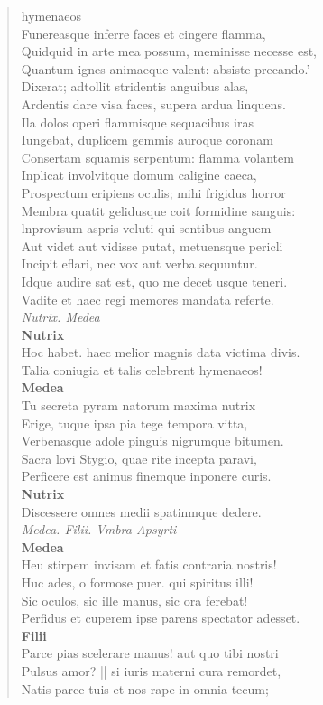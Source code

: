 \documentclass[11pt, a4paper]{report}
\begin{document}
\begin{verse}
{hymenaeos \\ Funereasque inferre faces et cingere flamma, \\ Quidquid in arte mea possum, meminisse necesse est, \\ Quantum ignes animaeque valent: absiste precando.’ \\ Dixerat; adtollit stridentis anguibus alas, \\ Ardentis dare visa faces, supera ardua linquens. \\ Ila dolos operi flammisque sequacibus iras \\ Iungebat, duplicem gemmis auroque coronam \\ Consertam squamis serpentum: flamma volantem \\ Inplicat involvitque domum caligine caeca, \\ Prospectum eripiens oculis; mihi frigidus horror \\ Membra quatit gelidusque coit formidine sanguis: \\ lnprovisum aspris veluti qui sentibus anguem \\ Aut videt aut vidisse putat, metuensque pericli \\ Incipit eflari, nec vox aut verba sequuntur. \\ Idque audire sat est, quo me decet usque teneri. \\ Vadite et haec regi memores mandata referte. \\ \textit{Nutrix. Medea} \\ \textbf{Nutrix} \\Hoc habet. haec melior magnis data victima divis. \\ Talia coniugia et talis celebrent hymenaeos! \\ \textbf{Medea} \\Tu secreta pyram natorum maxima nutrix \\ Erige,  \lbrack  tuque ipsa pia tege tempora vitta, \\ Verbenasque adole pinguis nigrumque bitumen. \\ Sacra lovi Stygio, quae rite incepta paravi, \\ Perficere est animus finemque inponere curis. \\ \textbf{Nutrix} \\Discessere omnes medii spatinmque dedere. \\ \textit{Medea. Filii. Vmbra Apsyrti} \\ \textbf{Medea} \\Heu stirpem invisam et fatis contraria nostris! \\ Huc ades, o formose puer. qui spiritus illi! \\ Sic oculos, sic ille manus, sic ora ferebat! \\ Perfidus et cuperem ipse parens spectator adesset. \\ \textbf{Filii} \\Parce pias scelerare manus! aut quo tibi nostri \\ Pulsus amor? || si iuris materni cura remordet, \\ Natis parce tuis et nos rape in omnia tecum; \\ }
\end{verse}
\end{document}
